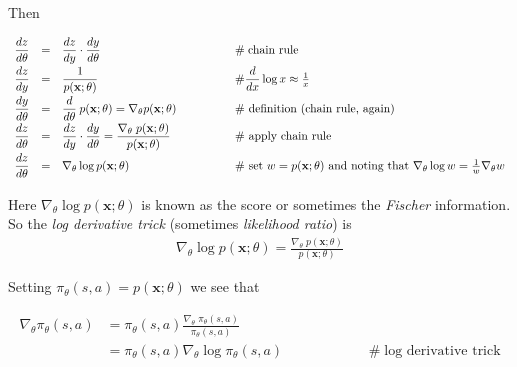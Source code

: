 \documentclass[11pt, oneside]{article}   	%
\begin{document}
\bigskip
\noindent
Then 

\begin{equation*}
\begin{array}{lllll}
\vspace{0.80mm}
\dfrac{dz}{d \theta} 
&=&                   \dfrac{dz}{dy} \cdot \dfrac{dy}{d\theta}                                               & \qquad \qquad \mathrel{\#}  \text{chain rule} \\
\vspace{0.80mm}
\dfrac{dz}{dy} 
&=&                     \dfrac{1}{p(\mathbf{x};\theta)}                                                        & \qquad \qquad \mathbin{\#} \dfrac{d}{dx} \log x \approx \frac{1}{x} \\
\vspace{0.80mm}
 \dfrac{dy}{d\theta} 
 &=& \dfrac{d}{d\theta}  \:p(\mathbf{x};\theta) = \nabla_\theta p(\mathbf{x};\theta)   & \qquad \qquad  \mathbin{\#} \text{ definition (chain rule, again)}\\
 \vspace{0.80mm}
 \dfrac{dz}{d \theta} 
 &=&          \dfrac{dz}{dy} \cdot \dfrac{dy}{d\theta} = \dfrac{\nabla_\theta \; p(\mathbf{x};\theta)}{p(\mathbf{x};\theta)} & \qquad \qquad  \mathbin{\#} \text{ apply chain rule} \\
 \vspace{0.80mm}
 \dfrac{dz}{d \theta} 
&=&  \nabla_\theta \log p(\mathbf{x};\theta)                                           & \qquad \qquad\mathbin{\#} \text{ set $w = p(\mathbf{x};\theta)$ and noting that } \nabla_{\theta} \log w = \frac{1}{w}\nabla_\theta w 
\end{array}
\end{equation*}

\bigskip
\noindent
Here $\nabla_\theta \log p(\mathbf{x};\theta)$ is known as the score or sometimes the \emph{Fischer} information. So the \emph{log derivative trick} (sometimes \emph{likelihood ratio}) is 
\begin{align*}
\nabla_\theta \log p(\mathbf{x};\theta)   = \frac{\nabla_\theta \; p(\mathbf{x};\theta)}{p(\mathbf{x};\theta)}
\end{align*}

\bigskip
\noindent
Setting  $\pi_\theta(s,a) = p(\mathbf{x};\theta)$ we see that

\begin{align*}
\nabla_\theta \pi_\theta(s,a) &= \pi_\theta(s,a) \frac{\nabla_\theta \; \pi_\theta(s,a)}{\pi_\theta(s,a)} \\
                                             &= \pi_\theta(s,a)  \nabla_\theta \log \pi_\theta(s,a)    \qquad \qquad \quad \; \; \; \mathbin{\#} \text{log derivative trick}                 
\end{align*}
\end{document}
